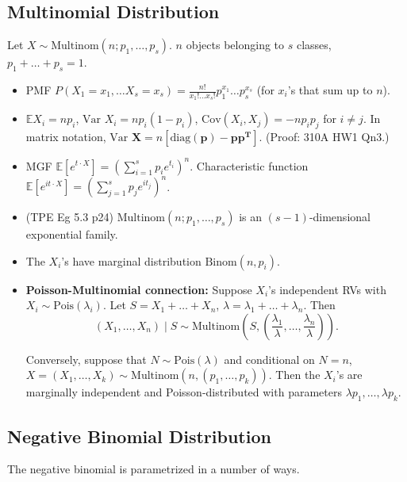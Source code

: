 \documentclass[twoside]{article}
\newcommand{\dis}{\displaystyle}
\newcommand\bbE{\mathbb{E}}
\newcommand\lmb{\lambda}
\newcommand\var{\text{Var }}
\begin{document}
\subsection{Multinomial Distribution}
Let $X \sim \text{Multinom}(n; p_1, \dots, p_s)$. $n$ objects belonging to $s$ classes, $p_1 + \dots + p_s = 1$.
\begin{itemize}
\item PMF $P(X_1 = x_1, \dots X_s = x_s) = \dis\frac{n!}{x_1! \dots x_s!} p_1^{x_1} \dots p_s^{x_s}$ (for $x_i$'s that sum up to $n$).

\item $\bbE X_i = np_i$, $\var X_i = np_i(1-p_i)$, $\text{Cov}(X_i, X_j) = -np_i p_j$ for $i \neq j$. In matrix notation, $\var \mathbf{X} = n \left[ \text{diag}(\mathbf{p}) - \mathbf{pp^T} \right]$. (Proof: 310A HW1 Qn3.)

\item MGF $\bbE [e^{t \cdot X}] = \left(\dis\sum_{i=1}^s p_i e^{t_i} \right)^n$. Characteristic function $\bbE [e^{it \cdot X}] = \left(\dis\sum_{j=1}^s p_j e^{it_j} \right)^n$.

\item (TPE Eg 5.3 p24) $\text{Multinom}(n; p_1, \dots, p_s)$ is an $(s-1)$-dimensional exponential family.

\item The $X_i$'s have marginal distribution $\text{Binom}(n, p_i)$.

\item \textbf{Poisson-Multinomial connection:} Suppose $X_i$'s independent RVs with $X_i \sim \text{Pois}(\lmb_i)$. Let $S = X_1 + \dots + X_n$, $\lmb = \lmb_1 + \dots + \lmb_n$. Then
\begin{equation*}
(X_1, \dots, X_n) \mid S \sim \text{Multinom}\left( S, \left( \frac{\lmb_1}{\lmb}, \dots, \frac{\lmb_n}{\lmb} \right) \right).
\end{equation*}

Conversely, suppose that $N \sim \text{Pois}(\lmb)$ and conditional on $N = n$, $X = (X_1, \dots, X_k) \sim \text{Multinom}(n, (p_1, \dots, p_k))$. Then the $X_i$'s are marginally independent and Poisson-distributed with parameters $\lmb p_1, \dots, \lmb p_k$.

\end{itemize}

\subsection{Negative Binomial Distribution}
The negative binomial is parametrized in a number of ways.
\end{document}
